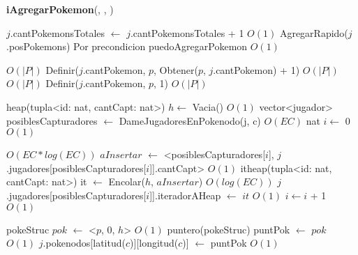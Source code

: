 \begin{Algoritmos}
\begin{algorithm}[H]
\begin{algorithmic}[1]
\end{algorithmic}
\end{algorithm}


\begin{algorithm}[H]
{\textbf{iAgregarPokemon}(, , )}
\begin{algorithmic}[1]

\State $j$.cantPokemonsTotales $\gets$ $j$.cantPokemonsTotales + 1 \Comment $O(1)$
\State AgregarRapido($j$.posPokemons) \Comment Por precondicion puedoAgregarPokemon $O(1)$

 \Comment $O(|P|)$
  \State Definir($j$.cantPokemon, $p$, Obtener($p$, $j$.cantPokemon) + 1) \Comment $O(|P|)$
\EndIf
{}  \Comment $O(|P|)$
  \State Definir($j$.cantPokemon, $p$, 1)  \Comment $O(|P|)$
\EndIf

\State heap(tupla<id: nat, cantCapt: nat>) $h \gets$ Vacia() \Comment $O(1)$
\State vector<jugador> \hspace{0.5mm} posiblesCapturadores $\gets$ DameJugadoresEnPokenodo(j, c) \Comment $O(EC)$
\State nat $i \gets$ 0 \Comment $O(1)$

 \Comment $O(EC*log(EC))$
  \State $aInsertar$ $\gets$ <posiblesCapturadores[$i$], $j$.jugadores[posiblesCapturadores[$i$]].cantCapt> \Comment $O(1)$
  \State itheap(tupla<id: nat, cantCapt: nat>) it $\gets$ Encolar($h$, $aInsertar$) \Comment $O(log(EC))$
  \State $j$.jugadores[posiblesCapturadores[$i$]].iteradorAHeap $\gets$ $it$ \Comment $O(1)$
  \State $i \gets i$ + 1 \Comment $O(1)$
\EndWhile

\State pokeStruc $pok$ $\gets$ <$p$, 0, $h$> \Comment $O(1)$
\State puntero(pokeStruc) puntPok $\gets$ $pok$ \Comment $O(1)$
\State $j$.pokenodos[latitud($c$)][longitud($c$)] $\gets$ puntPok \Comment $O(1)$


\end{algorithmic}
\end{algorithm}
\end{Algoritmos}
